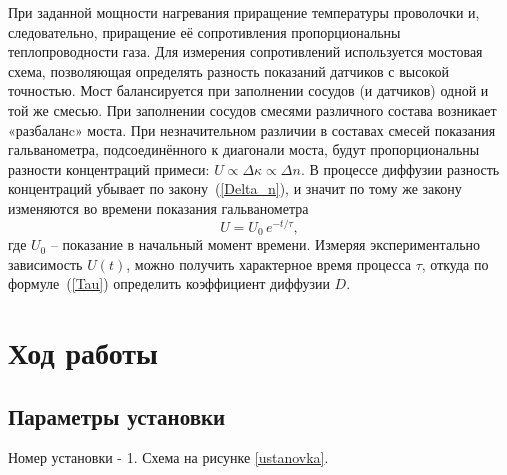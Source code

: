 \documentclass[a4paper, 12pt]{article}
\begin{document}
        При заданной мощности нагревания приращение температуры  проволочки и, следовательно, приращение её сопротивления пропорциональны теплопроводности газа. Для измерения сопротивлений используется мостовая схема, позволяющая определять разность показаний датчиков с высокой точностью. Мост балансируется при заполнении сосудов (и датчиков) одной и той же смесью. При заполнении сосудов смесями различного состава возникает «разбаланc» моста. При незначительном различии в составах смесей показания гальванометра, подсоединённого к диагонали моста, будут пропорциональны разности концентраций примеси: $U\propto\Delta \kappa \propto \Delta n$. В процессе диффузии разность концентраций убывает по закону~(\ref{Delta_n}), и значит по тому же закону изменяются во времени показания гальванометра
        \begin{equation}
            \label{U}
            U = U_0 \, e^{-t / \tau},
        \end{equation}
        где $U_0$ -- показание в начальный момент времени. Измеряя экспериментально зависимость $U(t)$, можно получить характерное время процесса $\tau$, откуда по формуле~(\ref{Tau}) определить коэффициент диффузии $D$.


    \section{Ход работы}
    \subsection{Параметры установки}
        Номер установки - 1. Схема на рисунке \ref{ustanovka}.
\end{document}
